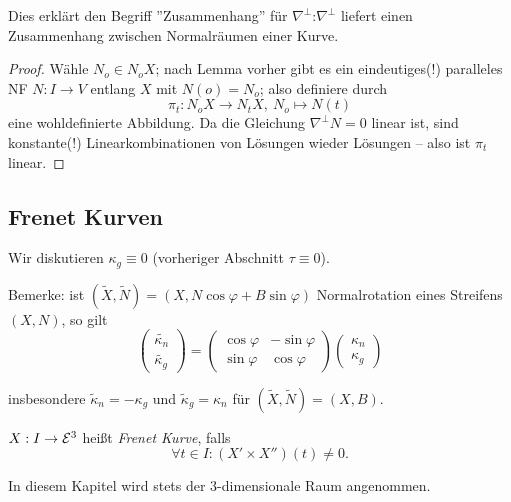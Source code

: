 \begin{remark}
	Dies erklärt den Begriff ''Zusammenhang'' für $\nabla^\perp$:$\nabla^\perp$ liefert einen Zusammenhang zwischen Normalräumen einer Kurve.
\end{remark}

\begin{proof}
	Wähle $N_o \in N_oX$; nach Lemma vorher gibt es ein eindeutiges(!) paralleles NF $N : I \rightarrow V$ entlang $X$ mit $N(o) = N_o$; also definiere durch 
	\[\pi_t: N_oX \rightarrow N_t X,~ N_o \mapsto N(t)  \] eine wohldefinierte Abbildung. Da die Gleichung $\nabla^\perp N = 0$ linear ist, sind konstante(!) Linearkombinationen von Lösungen wieder Lösungen -- also ist $\pi_t$ linear.
\end{proof}

\subsection{Frenet Kurven}

Wir diskutieren $\kappa_g \equiv 0$ (vorheriger Abschnitt $\tau \equiv 0$).

Bemerke: ist $(\widetilde{X},\widetilde{N}) =(X,N \cos \varphi + B \sin \varphi )$ Normalrotation eines Streifens $(X,N)$, so gilt 
\begin{equation*}
\begin{pmatrix} 
\widetilde{\kappa_n}\\
\widetilde{\kappa_g}
\end{pmatrix}
=
\begin{pmatrix} 
\cos \varphi & - \sin \varphi \\
\sin \varphi & \cos \varphi
\end{pmatrix}
\begin{pmatrix}
\kappa_n\\
\kappa_g
\end{pmatrix}
\end{equation*}

insbesondere $\widetilde{\kappa}_n = - \kappa_g $ und  $\widetilde{\kappa}_g = \kappa_n$
für $(\widetilde{X}, \widetilde{N}) = (X,B)$. %

\begin{definition}
	$X: I \rightarrow \mathcal E^3$ heißt \emph{Frenet Kurve}, falls \[ \forall t \in I: (X' \times X'')(t) \not = 0. \]
\end{definition}

\begin{remark}
	In diesem Kapitel wird stets der 3-dimensionale Raum angenommen.
\end{remark}


